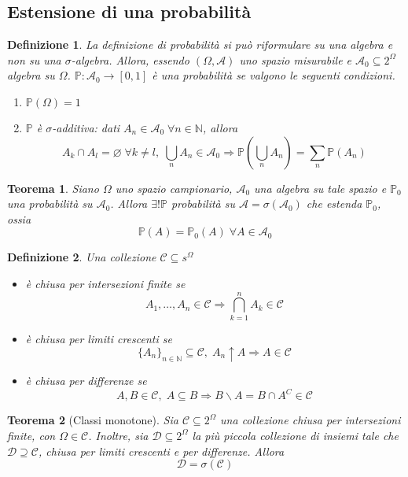 \documentclass[a4paper,12pt]{article}
\theoremstyle{break}
\newtheorem{theorem}{Teorema}[section]
\newtheorem{definition}{Definizione}[section]
\let\emptyset\varnothing
\numberwithin{equation}{section}
\begin{document}
\subsection{Estensione di una probabilità}
\begin{definition}
  La definizione di probabilità si può riformulare su una algebra e non su una \(\sigma\)-algebra. Allora, essendo \((\Omega, \mathcal{A})\) uno spazio misurabile e \(\mathcal{A}_0 \subseteq 2^{\Omega}\) algebra su \(\Omega\). \(\mathbb{P}:\mathcal{A}_0 \to [0,1]\) è una probabilità se valgono le seguenti condizioni.
  \begin{enumerate}
    \item \(\mathbb{P}(\Omega) = 1\)
    \item \(\mathbb{P}\) è \(\sigma\)-additiva: dati \(A_n \in \mathcal{A}_0 \; \forall n \in \mathbb{N}\), allora
    \[
      A_k \cap A_l = \emptyset \; \forall k \not = l, \; \bigcup_n A_n \in \mathcal{A}_0  \Longrightarrow \mathbb{P}\left(\bigcup_n A_n\right) = \sum_n \mathbb{P}(A_n)  
    \]
  \end{enumerate}
\end{definition}
\begin{theorem}
  Siano \(\Omega\) uno spazio campionario, \(\mathcal{A}_0\) una algebra su tale spazio e \(\mathbb{P}_0\) una probabilità su \(\mathcal{A}_0\). Allora \(\exists ! \mathbb{P}\) probabilità su \(\mathcal{A} = \sigma(\mathcal{A}_0)\) che estenda \(\mathbb{P}_0\), ossia
  \[
    \mathbb{P}(A) = \mathbb{P}_0(A) \; \forall A \in \mathcal{A}_0
  \] 
\end{theorem}
\begin{definition}
  Una collezione \(\mathcal{C} \subseteq s^{\Omega}\) 
  \begin{itemize}
    \item è chiusa per intersezioni finite se 
     \[
       A_1 ,\ldots, A_n \in \mathcal{C} \Longrightarrow \bigcap_{k=1}^n A_k \in \mathcal{C}
     \]
     \item è chiusa per limiti crescenti se
     \[
       \{A_n\}_{n \in \mathbb{N}} \subseteq \mathcal{C}, \; A_n \uparrow A \Longrightarrow A \in \mathcal{C}
     \]
     \item è chiusa per differenze se
     \[
       A, B \in \mathcal{C}, \; A \subseteq B \Longrightarrow B \backslash A = B \cap A^C \in \mathcal{C}
     \]
  \end{itemize}
\end{definition}
\begin{theorem}[Classi monotone]
  Sia \(\mathcal{C} \subseteq 2^{\Omega}\) una collezione chiusa per intersezioni finite, con \(\Omega \in \mathcal{C}\). Inoltre, sia \(\mathcal{D} \subseteq 2^{\Omega}\) la più piccola collezione di insiemi tale che \(\mathcal{D} \supseteq \mathcal{C}\), chiusa per limiti crescenti e per differenze. Allora
  \[
    \mathcal{D} = \sigma(\mathcal{C})
  \] 
\end{theorem}
\end{document}
